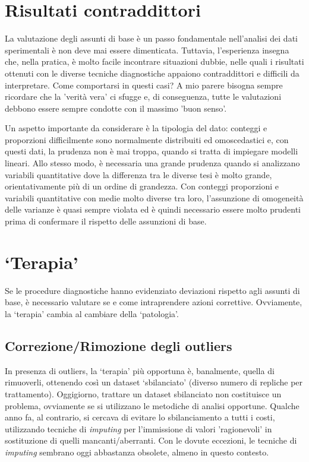 \documentclass[a4paper,12pt,oneside]{book}
\begin{document}
\hypertarget{risultati-contraddittori}{%
\section{Risultati contraddittori}\label{risultati-contraddittori}}

La valutazione degli assunti di base è un passo fondamentale nell'analisi dei dati sperimentali è non deve mai essere dimenticata. Tuttavia, l'esperienza insegna che, nella pratica, è molto facile incontrare situazioni dubbie, nelle quali i risultati ottenuti con le diverse tecniche diagnostiche appaiono contraddittori e difficili da interpretare. Come comportarsi in questi casi? A mio parere bisogna sempre ricordare che la 'verità vera' ci sfugge e, di conseguenza, tutte le valutazioni debbono essere sempre condotte con il massimo 'buon senso'.

Un aspetto importante da considerare è la tipologia del dato: conteggi e proporzioni difficilmente sono normalmente distribuiti ed omoscedastici e, con questi dati, la prudenza non è mai troppa, quando si tratta di impiegare modelli lineari. Allo stesso modo, è necessaria una grande prudenza quando si analizzano variabili quantitative dove la differenza tra le diverse tesi è molto grande, orientativamente più di un ordine di grandezza. Con conteggi proporzioni e variabili quantitative con medie molto diverse tra loro, l'assunzione di omogeneità delle varianze è quasi sempre violata ed è quindi necessario essere molto prudenti prima di confermare il rispetto delle assunzioni di base.

\hypertarget{terapia}{%
\section{`Terapia'}\label{terapia}}

Se le procedure diagnostiche hanno evidenziato deviazioni rispetto agli assunti di base, è necessario valutare se e come intraprendere azioni correttive. Ovviamente, la `terapia' cambia al cambiare della `patologia'.

\hypertarget{correzionerimozione-degli-outliers}{%
\subsection{Correzione/Rimozione degli outliers}\label{correzionerimozione-degli-outliers}}

In presenza di outliers, la `terapia' più opportuna è, banalmente, quella di rimuoverli, ottenendo così un dataset `sbilanciato' (diverso numero di repliche per trattamento). Oggigiorno, trattare un dataset sbilanciato non costituisce un problema, ovviamente se si utilizzano le metodiche di analisi opportune. Qualche anno fa, al contrario, si cercava di evitare lo sbilanciamento a tutti i costi, utilizzando tecniche di \emph{imputing} per l'immissione di valori 'ragionevoli' in sostituzione di quelli mancanti/aberranti. Con le dovute eccezioni, le tecniche di \emph{imputing} sembrano oggi abbastanza obsolete, almeno in questo contesto.
\end{document}
